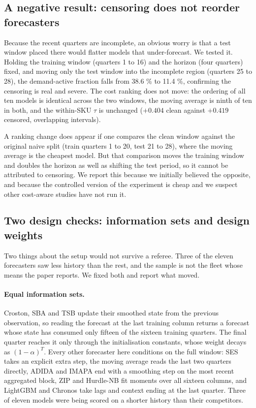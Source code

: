 \documentclass[11pt]{article}
\begin{document}
\subsection{A negative result: censoring does not reorder forecasters}

Because the recent quarters are incomplete, an obvious worry is that a test
window placed there would flatter models that under-forecast. We tested it.
Holding the training window (quarters 1 to 16) and the horizon (four quarters)
fixed, and moving only the test window into the incomplete region (quarters 25
to 28), the demand-active fraction falls from 38.6 \% to 11.4 \%, confirming
the censoring is real and severe. The cost ranking does not move: the ordering
of all ten models is identical across the two windows, the moving average is
ninth of ten in both, and the within-SKU $\tau$ is unchanged ($+0.404$ clean
against $+0.419$ censored, overlapping intervals).

A ranking change does appear if one compares the clean window against the
original naive split (train quarters 1 to 20, test 21 to 28), where the moving
average is the cheapest model. But that comparison moves the training window
and doubles the horizon as well as shifting the test period, so it cannot be
attributed to censoring. We report this because we initially believed the
opposite, and because the controlled version of the experiment is cheap and we
suspect other cost-aware studies have not run it.

\subsection{Two design checks: information sets and design weights}

Two things about the setup would not survive a referee. Three of the eleven
forecasters saw less history than the rest, and the sample is not the fleet
whose means the paper reports. We fixed both and report what moved.

\paragraph{Equal information sets.} Croston, SBA and TSB update their smoothed
state from the previous observation, so reading the forecast at the last
training column returns a forecast whose state has consumed only fifteen of the
sixteen training quarters. The final quarter reaches it only through the
initialisation constants, whose weight decays as $(1-\alpha)^{T}$. Every other
forecaster here conditions on the full window: SES takes an explicit extra
step, the moving average reads the last two quarters directly, ADIDA and IMAPA
end with a smoothing step on the most recent aggregated block, ZIP and
Hurdle-NB fit moments over all sixteen columns, and LightGBM and Chronos take
lags and context ending at the last quarter. Three of eleven models were being
scored on a shorter history than their competitors.
\end{document}
